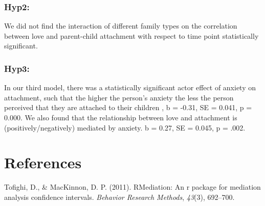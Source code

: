 \documentclass[man]{apa6}
\begin{document}
\hypertarget{hyp2}{%
\subsubsection{Hyp2:}\label{hyp2}}

We did not find the interaction of different family types on the correlation between love and parent-child attachment with respect to time point statistically significant.

\hypertarget{hyp3}{%
\subsubsection{Hyp3:}\label{hyp3}}

In our third model, there was a statistically significant actor effect of anxiety on attachment, such that the higher the person's anxiety the less the person perceived that they are attached to their children , b = -0.31, SE = 0.041, p = 0.000.
We also found that the relationship between love and attachment is (positively/negatively) mediated by anxiety. b = 0.27, SE = 0.045, p = .002.

\newpage

\hypertarget{references}{%
\section{References}\label{references}}

\begingroup
\setlength{\parindent}{-0.5in}
\setlength{\leftskip}{0.5in}

\hypertarget{refs}{}
\leavevmode\hypertarget{ref-monte}{}%
Tofighi, D., \& MacKinnon, D. P. (2011). RMediation: An r package for mediation analysis confidence intervals. \emph{Behavior Research Methods}, \emph{43}(3), 692--700.

\endgroup
\end{document}
